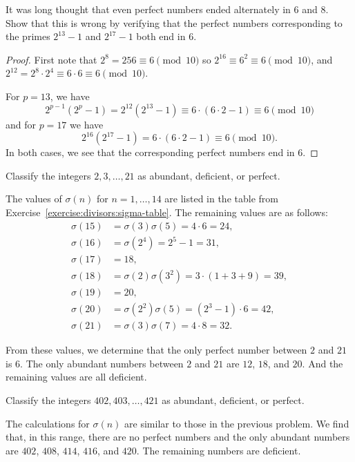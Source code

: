  It was long thought that even perfect numbers ended
alternately in $6$ and $8$. Show that this is wrong by verifying that
the perfect numbers corresponding to the primes $2^{13} - 1$ and
$2^{17} - 1$ both end in $6$.
\begin{proof}
  First note that $2^8 = 256\equiv6\pmod{10}$ so
  $2^{16}\equiv6^2\equiv6\pmod{10}$, and
  $2^{12} = 2^8\cdot2^4\equiv6\cdot6\equiv6\pmod{10}$.

  For $p = 13$, we have
  \begin{equation*}
    2^{p-1}(2^p - 1)
    = 2^{12}(2^{13} - 1)
    \equiv 6\cdot(6\cdot2 - 1)
    \equiv6\pmod{10}
  \end{equation*}
  and for $p = 17$ we have
  \begin{equation*}
    2^{16}(2^{17} - 1)
    = 6\cdot(6\cdot2 - 1)
    \equiv6\pmod{10}.
  \end{equation*}
  In both cases, we see that the corresponding perfect numbers end in
  $6$.
\end{proof}

 Classify the integers $2,3,\dots,21$ as abundant, deficient,
or perfect.
\begin{solution}
  The values of $\sigma(n)$ for $n = 1,\dots,14$ are listed in the
  table from Exercise~\ref{exercise:divisors:sigma-table}. The
  remaining values are as follows:
  \begin{align*}
    \sigma(15) &= \sigma(3)\sigma(5) = 4\cdot6 = 24, \\
    \sigma(16) &= \sigma(2^4) = 2^5 - 1 = 31, \\
    \sigma(17) &= 18, \\
    \sigma(18) &= \sigma(2)\sigma(3^2) = 3\cdot(1 + 3 + 9) = 39, \\
    \sigma(19) &= 20, \\
    \sigma(20) &= \sigma(2^2)\sigma(5) = (2^3 - 1)\cdot6 = 42, \\
    \sigma(21) &= \sigma(3)\sigma(7) = 4\cdot8 = 32.
  \end{align*}

  From these values, we determine that the only perfect number between
  $2$ and $21$ is $6$. The only abundant numbers between $2$ and $21$
  are $12$, $18$, and $20$. And the remaining values are all
  deficient.
\end{solution}

 Classify the integers $402, 403, \dots, 421$ as abundant,
deficient, or perfect.
\begin{solution}
  The calculations for $\sigma(n)$ are similar to those in the
  previous problem. We find that, in this range, there are no perfect
  numbers and the only abundant numbers are $402$, $408$, $414$,
  $416$, and $420$. The remaining numbers are deficient.
\end{solution}
